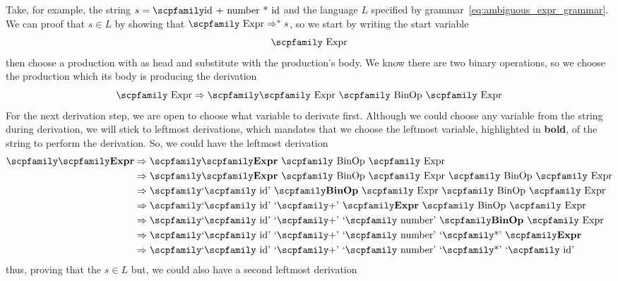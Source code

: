 \documentclass[
  oneside,
  english,
  coorientadorbanca,
  noabntexcite
]{ufsc-thesis-rn46-2019}
\newcommand{\codett}[1]{\text{\scpfamily#1}}
\newcommand{\code}[1]{\text{\scpfamily\setlength\spaceskip{0.35em}#1}}
\newcommand{\bnfvar}[1]{\codett{#1}}
\newcommand{\bnfter}[1]{\textrm{`}\codett{#1}\textrm{'}}
\begin{document}
Take, for example, the string $s = \code{id + number * id}$ and the language $L$ specified by grammar~\eqref{eq:ambiguous_expr_grammar}. We can proof that $s \in L$ by showing that $\bnfvar{Expr} \Rightarrow^* s$, so we start by writing the start variable
\begin{equation*}
  \bnfvar{Expr}
\end{equation*}
then choose a production with \bnfvar{Expr} as head and substitute \bnfvar{Exrp} with the production's body. We know there are two binary operations, so we choose the production which its body is \code{\bnfvar{Expr} \bnfvar{BinOP} \bnfvar{Expr}} producing the derivation
\begin{equation*}
  \bnfvar{Expr} \Rightarrow \code{\bnfvar{Expr} \bnfvar{BinOp} \bnfvar{Expr}}
\end{equation*}
For the next derivation step, we are open to choose what variable to derivate first.
Although we could choose any variable from the string during derivation, we will stick to leftmost derivations, which mandates that we choose the leftmost variable, highlighted in \textbf{bold}, of the string to perform the derivation.
So, we could have the leftmost derivation
\begin{equation}\label{eq:ambiouous_derivation1}
  \begin{aligned}
    \code{\bnfvar{\textbf{Expr}}}
     & \Rightarrow
    \code{\bnfvar{\textbf{Expr}} \bnfvar{BinOp} \bnfvar{Expr}}                              \\
     & \Rightarrow
    \code{\bnfvar{\textbf{Expr}} \bnfvar{BinOp} \bnfvar{Expr} \bnfvar{BinOp} \bnfvar{Expr}} \\
     & \Rightarrow
    \code{\bnfter{id} \bnfvar{\textbf{BinOp}} \bnfvar{Expr} \bnfvar{BinOp} \bnfvar{Expr}}   \\
     & \Rightarrow
    \code{\bnfter{id} \bnfter{+} \bnfvar{\textbf{Expr}} \bnfvar{BinOp} \bnfvar{Expr}}       \\
     & \Rightarrow
    \code{\bnfter{id} \bnfter{+} \bnfter{number} \bnfvar{\textbf{BinOp}} \bnfvar{Expr}}     \\
     & \Rightarrow
    \code{\bnfter{id} \bnfter{+} \bnfter{number} \bnfter{*} \bnfvar{\textbf{Expr}}}         \\
     & \Rightarrow
    \code{\bnfter{id} \bnfter{+} \bnfter{number} \bnfter{*} \bnfter{id}}
  \end{aligned}
\end{equation}
thus, proving that the $s \in L$
but, we could also have a second leftmost derivation
\end{document}

